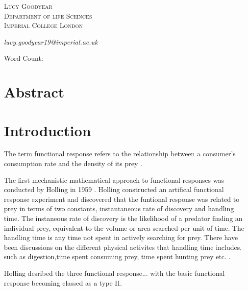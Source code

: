 \documentclass[11pt, a4paper, titlepage]{article}
\begin{document}
\begin{titlepage}
	
	
	
	\vspace{0.5\baselineskip} %
	
	{\scshape\Large Lucy Goodyear\\
		Department of life Sceinces \\
		Imperial College London\\} %
	
	\textit{lucy.goodyear19@imperial.ac.uk}
	\date{}
	
	\vspace*{3\baselineskip} %
	
	Word Count:
	
\end{titlepage}
	
\section*{Abstract}

\newpage

\linenumbers
\section{Introduction}
The term functional response refers to the relationship between a consumer's consumption rate and the density of its prey \parencite{Solomon1949}. 

The first mechanistic mathematical approach to functional responses was conducted by Holling in 1959 \parencite{Holling1959b}. Holling constructed an artifical functional response experiment and discovered that the funtional response was related to prey in terms of two constants, instantaneous rate of discovery and handling time. The instaneous rate of discovery is the likelihood of a predator finding an individual prey, equivalent to the volume or area searched per unit of time.
The handling time is any time not spent in actively searching for prey. There have been discussions on the different physical activites that handling time includes, such as digestion,time spent consuming prey, time spent hunting prey etc. \parencite{Jeschke2002, Holling1966}.

Holling desribed the three functional response...\parencite{Holling1959a} with the basic functional response becoming classed as a type II.
\end{document}
